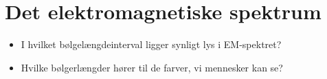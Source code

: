 \documentclass[a4paper, 12pt]{article}
\begin{document}
\section*{Det elektromagnetiske spektrum}
\label{sec:orgfdc5fe5}

\begin{minipage}{0.3\linewidth}
\begin{itemize}
\item I hvilket bølgelængdeinterval ligger synligt lys i EM-spektret?

\item Hvilke bølgerlængder hører til de farver, vi mennesker kan se?
\end{itemize}
\end{minipage}
\vline
\begin{minipage}{0.7\linewidth}
\end{minipage}
\end{document}
